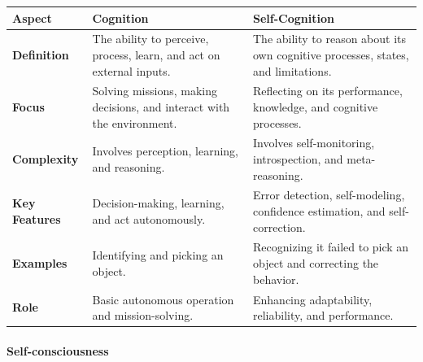 \documentclass{book}
\begin{document}
\begin{tabular}{|l|l|l|}
    \hline
    \textbf{Aspect}       & \textbf{Cognition}                                                     & \textbf{Self-Cognition}                                                           \\ \hline
    \textbf{Definition}   & The ability to perceive, process, learn, and act on external inputs. & The ability to reason about its own cognitive processes, states, and limitations. \\ \hline
    \textbf{Focus}        & Solving missions, making decisions, and interact with the environment. & Reflecting on its performance, knowledge, and cognitive processes. \\ \hline
    \textbf{Complexity}   & Involves perception, learning, and reasoning.                          & Involves self-monitoring, introspection, and meta-reasoning.                      \\ \hline
    \textbf{Key Features} & Decision-making, learning, and act autonomously.                    & Error detection, self-modeling, confidence estimation, and self-correction.       \\ \hline
    \textbf{Examples}     & Identifying and picking an object.                                     & Recognizing it failed to pick an object and correcting the behavior.              \\ \hline
    \textbf{Role}         & Basic autonomous operation and mission-solving.                           & Enhancing adaptability, reliability, and performance.                             \\ \hline
\end{tabular}


\paragraph{Self-consciousness}
\end{document}
